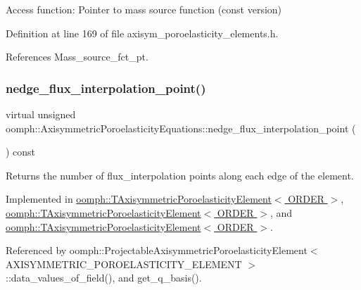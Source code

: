 Access function\+: Pointer to mass source function (const version) 



Definition at line 169 of file axisym\+\_\+poroelasticity\+\_\+elements.\+h.



References Mass\+\_\+source\+\_\+fct\+\_\+pt.

\mbox{\label{classoomph_1_1AxisymmetricPoroelasticityEquations_a16d82c2d6bf7f84f6529f4182f83e6ef}} 
\subsubsection{\texorpdfstring{nedge\+\_\+flux\+\_\+interpolation\+\_\+point()}{nedge\_flux\_interpolation\_point()}}
{\footnotesize\ttfamily virtual unsigned oomph\+::\+Axisymmetric\+Poroelasticity\+Equations\+::nedge\+\_\+flux\+\_\+interpolation\+\_\+point (\begin{DoxyParamCaption}{ }\end{DoxyParamCaption}) const\hspace{0.3cm}{\ttfamily [pure virtual]}}



Returns the number of flux\+\_\+interpolation points along each edge of the element. 



Implemented in \hyperlink{classoomph_1_1TAxisymmetricPoroelasticityElement_abe8ce45bd70932c365623a1919c69e5d}{oomph\+::\+T\+Axisymmetric\+Poroelasticity\+Element$<$ O\+R\+D\+E\+R $>$}, \hyperlink{classoomph_1_1TAxisymmetricPoroelasticityElement_a4352c34520749f27a95a0b0161d3e4a7}{oomph\+::\+T\+Axisymmetric\+Poroelasticity\+Element$<$ O\+R\+D\+E\+R $>$}, and \hyperlink{classoomph_1_1TAxisymmetricPoroelasticityElement_ac7e51a2a3dae948df106d34fe6fe6e29}{oomph\+::\+T\+Axisymmetric\+Poroelasticity\+Element$<$ O\+R\+D\+E\+R $>$}.



Referenced by oomph\+::\+Projectable\+Axisymmetric\+Poroelasticity\+Element$<$ A\+X\+I\+S\+Y\+M\+M\+E\+T\+R\+I\+C\+\_\+\+P\+O\+R\+O\+E\+L\+A\+S\+T\+I\+C\+I\+T\+Y\+\_\+\+E\+L\+E\+M\+E\+N\+T $>$\+::data\+\_\+values\+\_\+of\+\_\+field(), and get\+\_\+q\+\_\+basis().

